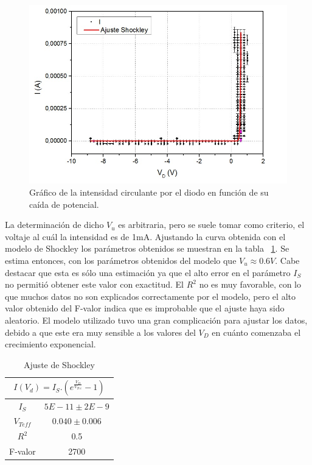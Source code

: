 \documentclass[twoside,twocolumn,a4paper]{article}
\begin{document}
\begin{figure}[h!]
\includegraphics[width=\linewidth]{diodograph.jpg}
\captionsetup{justification=centering}
\caption{Gr\'afico de la intensidad circulante por el diodo en funci\'on de su ca\'ida de potencial.}
\label{fig:diodo_shock}
\end{figure}

La determinaci\'on de dicho $V_u$ es arbitraria, pero se suele tomar como criterio, el voltaje al cu\'al la intensidad es de 1mA. Ajustando la curva obtenida con el modelo de Shockley los par\'ametros obtenidos se muestran en la tabla ~\ref{tab:diodo}. Se estima entonces, con los par\'ametros obtenidos del modelo que $V_u\approx0.6V$. Cabe destacar que esta es s\'olo una estimaci\'on ya que el alto error en el par\'ametro $I_S$ no permiti\'o obtener este valor con exactitud. El $R^2$ no es muy favorable, con lo que muchos datos no son explicados correctamente por el modelo, pero el alto valor obtenido del F-valor indica que es improbable que el ajuste haya sido aleatorio. El modelo utilizado tuvo una gran complicaci\'on para ajustar los datos, debido a que este era muy sensible a los valores del $V_D$ en cu\'anto comenzaba el crecimiento exponencial. \par 

\begin{table}[h!]
\centering
\captionsetup{justification=centering}
\caption{Ajuste de Shockley}
\label{tab:diodo}
\begin{tabular}{|c|c|}
\hline
\multicolumn{2}{|c|}{$I(V_d)=I_S . (e^\frac{V_D}{V_{Tee}}-1)$} \\ \hline
$I_S$                       & $5E-11\pm2E-9$                   \\ \hline
$V_{Teff}$                  & $0.040\pm0.006$                  \\ \hline
$R^2$                       & 0.5                              \\ \hline
F-valor                     & 2700                             \\ \hline
\end{tabular}
\end{table}
\end{document}
